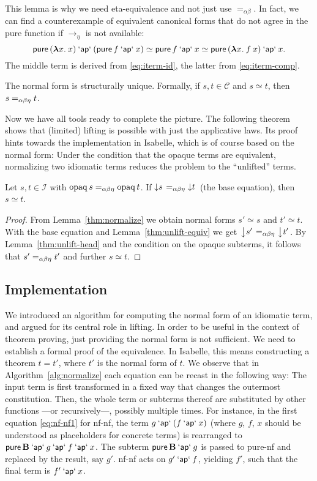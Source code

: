 This lemma is why we need eta-equivalence and not just use $=_{\alpha\beta}$.
In fact, we can find a counterexample of equivalent canonical forms that do
not agree in the pure function if $\to_\eta$ is not available:
\[ \operatorname{\mathsf{pure}}{({\boldsymbol\lambda} x.\>x)} \mathbin{\mathsf{`ap`}} (\operatorname{\mathsf{pure}} f \mathbin{\mathsf{`ap`}} x) \simeq
	\operatorname{\mathsf{pure}} f \mathbin{\mathsf{`ap`}} x \simeq \operatorname{\mathsf{pure}}{({\boldsymbol\lambda} x.\>f \> x)} \mathbin{\mathsf{`ap`}} x. \]
The middle term is derived from \eqref{eq:iterm-id}, the latter from
\eqref{eq:iterm-comp}.

\begin{corollary}\label{thm:nf-unique}
The normal form is structurally unique.
Formally, if $s,t \in \mathcal{C}$ and $s \simeq t$, then $s =_{\alpha\beta\eta} t$.
\end{corollary}

Now we have all tools ready to complete the picture.
The following theorem shows that (limited) lifting is possible with just
the applicative laws.
Its proof hints towards the implementation in Isabelle, which is of course
based on the normal form:
Under the condition that the opaque terms are equivalent, normalizing two
idiomatic terms reduces the problem to the ``unlifted'' terms.

\begin{theorem}\label{thm:nf-lifting}
Let $s,t \in \mathcal{I}$ with $\operatorname{opaq} s =_{\alpha\beta\eta} \operatorname{opaq} t$.
If $\left\downarrow s\right. =_{\alpha\beta\eta} \left\downarrow t\right.$ (the base equation), then $s \simeq t$.
\end{theorem}
\begin{proof}
From Lemma~\ref{thm:normalize} we obtain normal forms $s' \simeq s$ and
$t' \simeq t$.
With the base equation and Lemma~\ref{thm:unlift-equiv} we get
$\left\downarrow s'\right. =_{\alpha\beta\eta} \left\downarrow t'\right.$.
By Lemma~\ref{thm:unlift-head} and the condition on the opaque subterms, it
follows that $s' =_{\alpha\beta\eta} t'$ and further $s \simeq t$.
\end{proof}

\subsection{Implementation}\label{subsec:nf-implementation}  %

We introduced an algorithm for computing the normal form of an idiomatic term,
and argued for its central role in lifting.
In order to be useful in the context of theorem proving, just providing the
normal form is not sufficient.
We need to establish a formal proof of the equivalence.
In Isabelle, this means constructing a theorem $t = t'$, where $t'$ is the
normal form of $t$.
We observe that in Algorithm~\ref{alg:normalize} each equation can be recast
in the following way:
The input term is first transformed in a fixed way that changes the outermost
constitution.
Then, the whole term or subterms thereof are substituted by other functions%
---or recursively---, possibly multiple times.
For instance, in the first equation \eqref{eq:nf-nf1} for nf-nf, the term
$g \mathbin{\mathsf{`ap`}} (f \mathbin{\mathsf{`ap`}} x)$ (where $g$, $f$, $x$ should be understood as placeholders
for concrete terms) is rearranged to $\operatorname{\mathsf{pure}} \mathbf{B} \mathbin{\mathsf{`ap`}} g \mathbin{\mathsf{`ap`}} f \mathbin{\mathsf{`ap`}} x$.
The subterm $\operatorname{\mathsf{pure}} \mathbf{B} \mathbin{\mathsf{`ap`}} g$ is passed to pure-nf and replaced by
the result, say $g'$.
nf-nf acts on $g' \mathbin{\mathsf{`ap`}} f$, yielding $f'$, such that the final term is
$f' \mathbin{\mathsf{`ap`}} x$.

